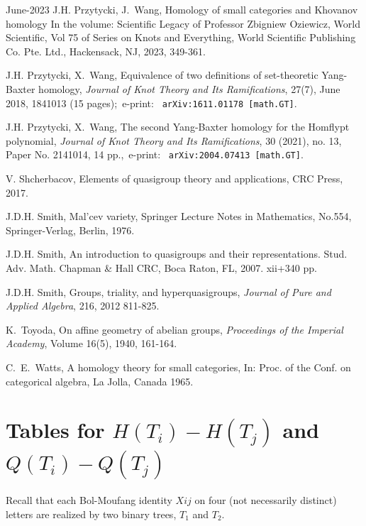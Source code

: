 \documentclass[11pt]{amsart}
\theoremstyle{definition}
\begin{document}
\begin{thebibliography}{June-2023}
 J.H. Przytycki, J.~Wang,
Homology of small categories and Khovanov homology 
In the volume: Scientific Legacy of Professor Zbigniew Oziewicz, World Scientific, Vol 75 of Series on Knots and Everything,
World Scientific Publishing Co. Pte. Ltd., Hackensack, NJ, 2023, 349-361.

J.H. Przytycki, X.~Wang, 
Equivalence of two definitions of set-theoretic Yang-Baxter homology,
{\it Journal of Knot Theory and Its Ramifications}, 27(7), June 2018, 1841013 (15 pages);\
e-print: \ {\tt arXiv:1611.01178 [math.GT]}.

J.H. Przytycki, X.~Wang, The second Yang-Baxter homology for the Homflypt polynomial,
{\it Journal of Knot Theory and Its Ramifications}, 30 (2021), no. 13, Paper No. 2141014, 14 pp.,\
e-print: \ {\tt   arXiv:2004.07413 [math.GT]}.

V. Shcherbacov, Elements of quasigroup theory and applications,
CRC Press, 2017.

 J.D.H. Smith, Mal'cev variety, Springer Lecture Notes in Mathematics, No.554, Springer-Verlag, Berlin, 1976.

\bibitem[Smi2]{Smi2} J.D.H. Smith, An introduction to quasigroups and their representations.
Stud. Adv. Math.
Chapman \& Hall CRC, Boca Raton, FL, 2007. xii+340 pp.

 J.D.H. Smith, Groups, triality, and hyperquasigroups, {\it Journal of Pure and Applied Algebra}, 216, 2012 811-825.

\bibitem [Toy]{Toy} K.~Toyoda,
On affine geometry of abelian groups,
{\it Proceedings of the Imperial Academy}, Volume 16(5),  1940, 161-164.

\bibitem[Wat]{Wat}
C.~E.~Watts, A homology theory for small categories, In: Proc. of the Conf. on categorical algebra,
La Jolla, Canada 1965. 
\end{thebibliography}

\appendix

\section{Tables for $H(T_i)-H(T_j)$ and $ Q(T_i) - Q(T_j)$} 

Recall that each Bol-Moufang identity $Xij$ on four (not necessarily distinct) letters are realized by two binary trees, $T_1$ and $T_2$.
\end{document}
